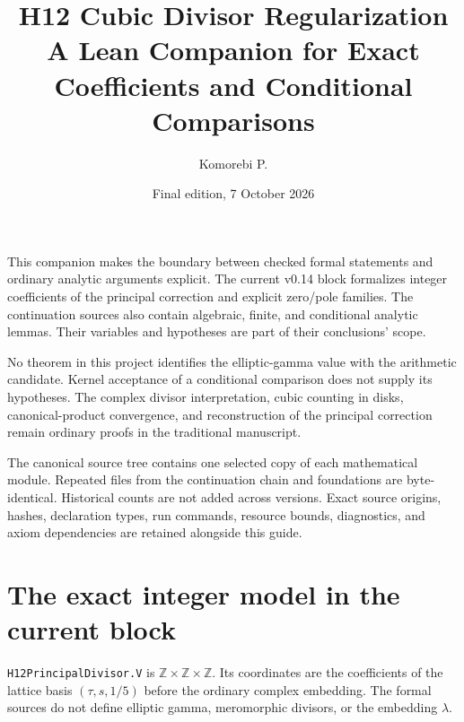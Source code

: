 \documentclass[11pt]{article}
\title{H12 Cubic Divisor Regularization\\\large A Lean Companion for Exact Coefficients and Conditional Comparisons}
\author{Komorebi P.}
\date{Final edition, 7 October 2026}
\newcommand{\decl}[1]{\nolinkurl{#1}}
\begin{document}
\KomorebiCover

\relax
\thispagestyle{plain}

This companion makes the boundary between checked formal statements and ordinary analytic arguments explicit. The current v0.14 block formalizes integer coefficients of the principal correction and explicit zero/pole families. The continuation sources also contain algebraic, finite, and conditional analytic lemmas. Their variables and hypotheses are part of their conclusions' scope.

No theorem in this project identifies the elliptic-gamma value with the arithmetic candidate. Kernel acceptance of a conditional comparison does not supply its hypotheses. The complex divisor interpretation, cubic counting in disks, canonical-product convergence, and reconstruction of the principal correction remain ordinary proofs in the traditional manuscript.



The canonical source tree contains one selected copy of each mathematical module. Repeated files from the continuation chain and foundations are byte-identical. Historical counts are not added across versions. Exact source origins, hashes, declaration types, run commands, resource bounds, diagnostics, and axiom dependencies are retained alongside this guide.

\clearpage
\begingroup
\setlength{\parskip}{0pt}
\makeatletter
\renewcommand*\l@section[2]{\@dottedtocline{1}{0em}{2.6em}{#1}{#2}}
\makeatother
\tableofcontents
\endgroup
\clearpage

\section{The exact integer model in the current block}

\decl{H12PrincipalDivisor.V} is \(\mathbb Z\times\mathbb Z\times\mathbb Z\). Its coordinates are the coefficients of the lattice basis \((\tau,s,1/5)\) before the ordinary complex embedding. The formal sources do not define elliptic gamma, meromorphic divisors, or the embedding \(\lambda\).
\end{document}
